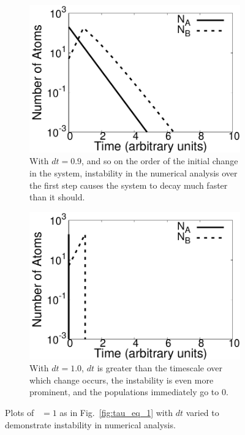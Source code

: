 \documentclass[pra,twocolumn,showpacs,amsmath,amssymb]{revtex4-1}
\begin{document}
\begin{figure}[h!]
  \begin{subfigure}[t]{.8\linewidth}
    \includegraphics[width=\linewidth]{t_eq_1_unstable.pdf}
    \caption{ With $dt=0.9$, and so on the order of the initial change in the system, instability in the
    numerical analysis over the first step causes the system to decay much faster
    than it should.}
    \label{fig:tau_eq_1_unstable}
  \end{subfigure}

  \begin{subfigure}[t]{.8\linewidth}
    \includegraphics[width=\linewidth]{t_eq_1_vunstable.pdf}
    \caption{With $dt=1.0$,
    $dt$ is greater than the timescale over which change occurs,
    the instability is even more prominent, and the populations immediately go
    to 0.}
    \label{fig:tau_eq_1_vunstable}
  \end{subfigure}

  \caption{Plots of \trel~$ = 1$ as in Fig.~\ref{fig:tau_eq_1} with $dt$ varied
  to demonstrate instability in numerical analysis.}
\end{figure}
\end{document}
